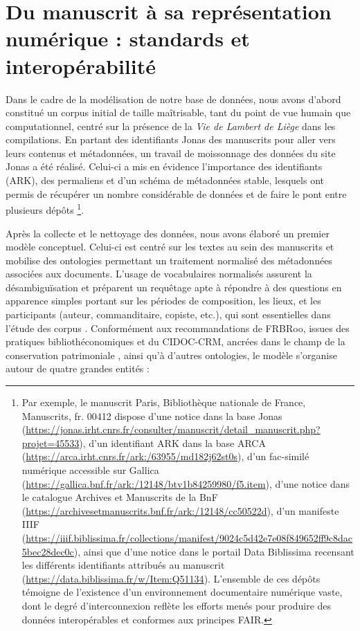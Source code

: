 \documentclass[final, fra]{anthology-ch}     %
\begin{document}
\section{Du manuscrit à sa représentation numérique : standards et interopérabilité}\label{2RepresentationNumérique}

Dans le cadre de la modélisation de notre base de données, nous avons d'abord constitué un corpus initial de taille maîtrisable, tant du point de vue humain que computationnel, centré sur la présence de la \textit{Vie de Lambert de Liège} dans les compilations. En partant des identifiants Jonas des manuscrits pour aller vers leurs contenus et métadonnées, un travail de moissonnage des données du site Jonas a été réalisé. Celui-ci a mis en évidence l'importance des identifiants (ARK), des permaliens et d'un schéma de métadonnées stable, lesquels ont permis de récupérer un nombre considérable de données et de faire le pont entre plusieurs dépôts \footnote{Par exemple, le manuscrit Paris, Bibliothèque nationale de France, Manuscrits, fr. 00412 dispose d'une notice dans la base Jonas (\url{https://jonas.irht.cnrs.fr/consulter/manuscrit/detail_manuscrit.php?projet=45533}), d'un identifiant ARK dans la base ARCA (\url{https://arca.irht.cnrs.fr/ark:/63955/md182j62st0s}), d'un fac-similé numérique accessible sur Gallica (\url{https://gallica.bnf.fr/ark:/12148/btv1b84259980/f5.item}), d'une notice dans le catalogue Archives et Manuscrits de la BnF (\url{https://archivesetmanuscrits.bnf.fr/ark:/12148/cc50522d}), d'un manifeste IIIF (\url{https://iiif.biblissima.fr/collections/manifest/9024c5d42e7e08f849652ff9c8dac5bec28dec0c}), ainsi que d'une notice dans le portail Data Biblissima recensant les différents identifiants attribués au manuscrit (\url{https://data.biblissima.fr/w/Item:Q51134}). L'ensemble de ces dépôts témoigne de l'existence d'un environnement documentaire numérique vaste, dont le degré d'interconnexion reflète les efforts menés pour produire des données interopérables et conformes aux principes FAIR.}.

Après la collecte et le nettoyage des données, nous avons élaboré un premier modèle conceptuel. Celui-ci est centré sur les \og textes \fg{} au sein des manuscrits et mobilise des ontologies permettant un traitement normalisé des métadonnées associées aux documents. L'usage de vocabulaires normalisés assurent la désambiguïsation et préparent un requêtage apte à répondre à des questions en apparence simples portant sur les périodes de composition, les lieux, et les participants (auteur, commanditaire, copiste, etc.), qui sont essentielles dans l'étude des corpus \cite{hassner_computation_2013}. Conformément aux recommandations de FRBRoo, issues des pratiques bibliothéconomiques et du CIDOC-CRM, ancrées dans le champ de la conservation patrimoniale \cite{buard_modelisation_2015}, ainsi qu'à d'autres ontologies, le modèle s'organise autour de quatre grandes entités :
\end{document}

